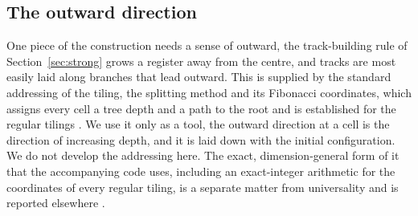 \subsection{The outward direction}
\label{sec:outward}

One piece of the construction needs a sense of outward, the track-building rule of Section~\ref{sec:strong}
grows a register away from the centre, and tracks are most easily laid along branches that lead outward. This
is supplied by the standard addressing of the tiling, the splitting method and its Fibonacci coordinates, which
assigns every cell a tree depth and a path to the root and is established for the regular tilings
\cite{margenstern2007vol1}. We use it only as a tool, the outward direction at a cell is the direction of
increasing depth, and it is laid down with the initial configuration. We do not develop the addressing here.
The exact, dimension-general form of it that the accompanying code uses, including an exact-integer arithmetic
for the coordinates of every regular tiling, is a separate matter from universality and is reported elsewhere
\cite{pollard2026vibe}.
